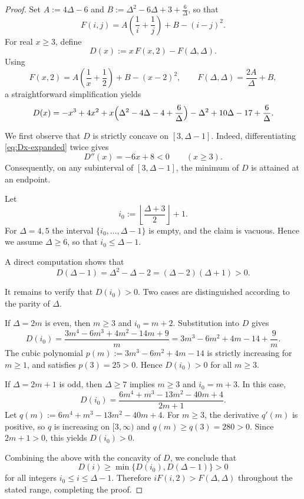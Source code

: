 \documentclass[preprint,12pt]{elsarticle}
\begin{document}
\begin{proof}
Set $A:=4\Delta-6$ and $B:=\Delta^2-6\Delta+3+\frac{6}{\Delta}$, so that
\[
F(i,j)=A\left(\frac1i+\frac1j\right)+B-(i-j)^2.
\]
For real $x\ge 3$, define
\[
D(x):=x\,F(x,2)-F(\Delta,\Delta).
\]
Using
\[
F(x,2)=A\left(\frac1x+\frac12\right)+B-(x-2)^2,
\qquad
F(\Delta,\Delta)=\frac{2A}{\Delta}+B,
\]
a straightforward simplification yields
\begin{equation}
\label{eq:Dx-expanded}
D(x)=-x^3+4x^2+x\Bigl(\Delta^2-4\Delta-4+\frac{6}{\Delta}\Bigr)
-\Delta^2+10\Delta-17+\frac{6}{\Delta}.
\end{equation}

We first observe that $D$ is strictly concave on $[3,\Delta-1]$. Indeed,
differentiating \eqref{eq:Dx-expanded} twice gives
\[
D''(x)=-6x+8<0\qquad (x\ge 3).
\]
Consequently, on any subinterval of $[3,\Delta-1]$, the minimum of $D$ is attained
at an endpoint.

Let
\[
i_0:=\left\lfloor \frac{\Delta+3}{2} \right\rfloor + 1.
\]
For $\Delta=4,5$ the interval $\{i_0,\dots,\Delta-1\}$ is empty, and the claim is
vacuous. Hence we assume $\Delta\ge 6$, so that $i_0\le \Delta-1$.

A direct computation shows that
\begin{equation}
\label{eq:D-Delta-1}
D(\Delta-1)=\Delta^2-\Delta-2=(\Delta-2)(\Delta+1)>0.
\end{equation}

It remains to verify that $D(i_0)>0$.
Two cases are distinguished according to the parity of $\Delta$.

If $\Delta=2m$ is even, then $m\ge 3$ and $i_0=m+2$. Substitution into $D$ gives
\[
D(i_0)=\frac{3m^4-6m^3+4m^2-14m+9}{m}
=3m^3-6m^2+4m-14+\frac{9}{m}.
\]
The cubic polynomial $p(m):=3m^3-6m^2+4m-14$ is strictly increasing for $m\ge1$,
and satisfies $p(3)=25>0$. Hence $D(i_0)>0$ for all $m\ge3$.

If $\Delta=2m+1$ is odd, then $\Delta\ge7$ implies $m\ge3$ and $i_0=m+3$.
In this case,
\[
D(i_0)=\frac{6m^4+m^3-13m^2-40m+4}{2m+1}.
\]
Let $q(m):=6m^4+m^3-13m^2-40m+4$. For $m\ge3$, the derivative $q'(m)$ is positive,
so $q$ is increasing on $[3,\infty)$ and
$q(m)\ge q(3)=280>0$. Since $2m+1>0$, this yields $D(i_0)>0$.

Combining the above with the concavity of $D$, we conclude that
\[
D(i)\ge \min\{D(i_0),D(\Delta-1)\}>0
\]
for all integers $i_0\le i\le \Delta-1$. Therefore
$iF(i,2)>F(\Delta,\Delta)$ throughout the stated range, completing the proof.
\end{proof}
\end{document}
